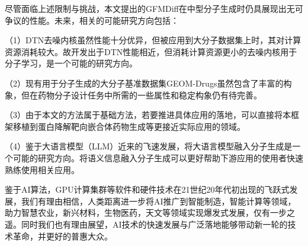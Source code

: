 尽管面临上述限制与挑战，本文提出的GFMDiff在中型分子生成时仍具展现出无可争议的性能。未来，相关的可能研究方向包括：

（1）DTN去噪内核虽然性能十分优异，但被应用到大分子数据集上时，其对计算资源消耗较大。故开发出于DTN性能相近，但消耗计算资源更小的去噪内核用于分子学习，是一个可能的研究方向。

（2）现有用于分子生成的大分子基准数据集GEOM-Drugs虽然包含了丰富的构象，但在药物分子设计任务中所需的一些属性和稳定构象仍有待完善。

（3）由于本文的方法属于基础方法，若要推进具体应用的落地，可以直接将本框架移植到蛋白降解靶向嵌合体药物生成等更接近实际应用的领域。

（4）鉴于大语言模型（LLM）近来的飞速发展，将大语言模型融入分子生成是一个可能的研究方向。将语义信息融入分子生成可以更好帮助下游应用的使用者快速熟练使用相关应用。

鉴于AI算法，GPU计算集群等软件和硬件技术在21世纪20年代初出现的飞跃式发展，我们有理由相信，人类距离进一步将AI推广到智能制造，智能计算等领域，助力智慧农业，新兴材料，生物医药，天文等领域实现爆发式发展，仅有一步之遥。同时我们也有理由展望，AI技术的快速发展与广泛落地能够带动新一轮的技术革命，并更好的普惠大众。